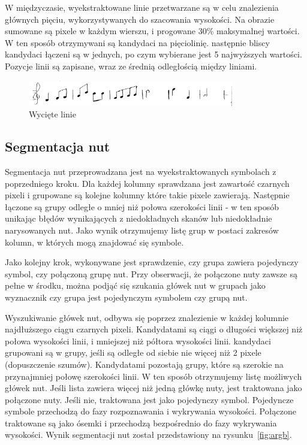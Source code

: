 \documentclass[a4paper,11pt]{article}
\begin{document}
W międzyczasie, wyekstraktowane linie przetwarzane są w celu znalezienia głównych pięciu, wykorzystywanych do szacowania wysokości.
Na obrazie sumowane są pixele w każdym wierszu, i progowane 30\% maksymalnej wartości.
W ten sposób otrzymywani są kandydaci na pięciolinię. następnie bliscy kandydaci łączeni są w jednych, po czym wybierane jest 5 najwyższych wartości.
Pozycje linii są zapisane, wraz ze średnią odległością między liniami.

\begin{figure}
\centering
\includegraphics[width=0.8\textwidth]{notes.jpg}
\caption{Wycięte linie}
\label{fig:notes}
\end{figure}

\subsection{Segmentacja nut}
Segmentacja nut przeprowadzana jest na wyekstraktowanych symbolach z poprzedniego kroku.
Dla każdej kolumny sprawdzana jest zawartość czarnych pixeli i grupowane są kolejne kolumny które takie pixele zawierają.
Następnie łączone są grupy odległe o mniej niż połowa szerokości linii - w ten sposób unikając błędów wynikających z niedokładnych skanów lub niedokładnie narysowanych nut.
Jako wynik otrzymujemy listę grup w postaci zakresów kolumn, w których mogą znajdować się symbole.

Jako kolejny krok, wykonywane jest sprawdzenie, czy grupa zawiera pojedynczy symbol, czy połączoną grupę nut.
Przy obserwacji, że połączone nuty zawsze są pełne w środku, można podjąć się szukania główek nut w grupach jako wyznacznik czy grupa jest pojedynczym symbolem czy grupą nut.

Wyszukiwanie główek nut, odbywa się poprzez znalezienie w każdej kolumnie najdłuższego ciągu czarnych pixeli.
Kandydatami są ciągi o długości większej niż połowa wysokości linii, i mniejszej niż półtora wysokości linii.
kandydaci grupowani są w grupy, jeśli są odległe od siebie nie więcej niż 2 pixele (dopuszczenie szumów).
Kandydatami pozostają grupy, które są szerokie na przynajmniej połowę szerokości linii.
W ten sposób otrzymujemy listę możliwych główek nut.  Jeśli lista zawiera więcej niż jedną główkę nuty, jest traktowana jako połączone nuty.
Jeśli nie, traktowana jest jako pojedynczy symbol. Pojedyncze symbole przechodzą do fazy rozpoznawania i wykrywania wysokości.
Połączone traktowane są jako ósemki i przechodzą bezpośrednio do fazy wykrywania wysokości.
Wynik segmentacji nut został przedstawiony na rysunku~\ref{fig:argb}.
\end{document}
